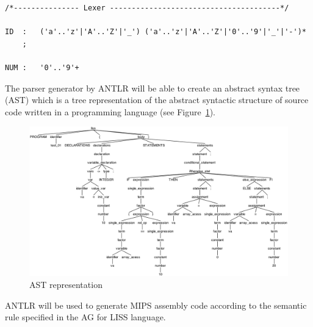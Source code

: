 \documentclass[
  oneside,
  11pt, a4paper,
  footinclude=true,
  headinclude=true,
  cleardoublepage=empty
]{scrbook}
\begin{document}
\begin{lstlisting}[caption={Lexer representation},label={lst:lexer}]
/*--------------- Lexer ---------------------------------------*/

ID  :   ('a'..'z'|'A'..'Z'|'_') ('a'..'z'|'A'..'Z'|'0'..'9'|'_'|'-')*
    ;

NUM :   '0'..'9'+
\end{lstlisting}



The parser generator by ANTLR will be able to create an abstract syntax tree (AST) which is a tree representation of the abstract syntactic structure of source code written in a programming language (see Figure~\ref{fig:AST}).

\begin{figure}[h!]
  \centering
    \includegraphics[width=1\textwidth]{img/antlr4_parse_tree.png}
    \caption{AST representation}
    \label{fig:AST}
\end{figure}

ANTLR will be used to generate MIPS assembly code according to the semantic rule specified in the AG for LISS language.



\end{document}

